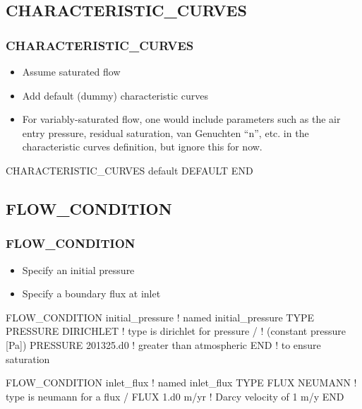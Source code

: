 \documentclass{beamer}
\newcommand\gehcomment[1]{{{\color{orange} #1}}}
\newcommand\redcomment[1]{{{\color{red} #1}}}
\newcommand\bluecomment[1]{{{\color{blue} #1}}}
\newcommand\greencomment[1]{{{\color{green} #1}}}
\begin{document}
\subsection{CHARACTERISTIC\_CURVES}

\begin{frame}[fragile]\frametitle{CHARACTERISTIC\_CURVES}

\begin{itemize}
\item Assume saturated flow
\item Add default (dummy) characteristic curves
\item For variably-saturated flow, one would include parameters such as the air entry pressure, residual saturation, van Genuchten ``n'', etc. in the characteristic curves definition, \gehcomment{but ignore this for now}.
\end{itemize}

\begin{semiverbatim}

CHARACTERISTIC_CURVES default
  DEFAULT
END
\end{semiverbatim}

\end{frame}

\subsection{FLOW\_CONDITION}

\begin{frame}[fragile]\frametitle{FLOW\_CONDITION}

\begin{itemize}
\item Specify an initial pressure
\item Specify a boundary flux at inlet
\end{itemize}

\begin{semiverbatim}
FLOW_CONDITION initial_pressure \bluecomment{! named \greencomment{initial_pressure}}
  TYPE
    PRESSURE DIRICHLET   \bluecomment{! type is \redcomment{dirichlet} for pressure}
  /                      \bluecomment{!   (constant pressure [Pa])}
  PRESSURE 201325.d0     \bluecomment{! greater than atmospheric}
END                      \bluecomment{!   to ensure saturation}

FLOW_CONDITION inlet_flux \bluecomment{! named \greencomment{inlet_flux}}
  TYPE
    FLUX NEUMANN          \bluecomment{! type is \redcomment{neumann} for a flux}
  /
  FLUX 1.d0 m/yr          \bluecomment{! Darcy velocity of 1 m/y}
END
\end{semiverbatim}

\end{frame}
\end{document}
